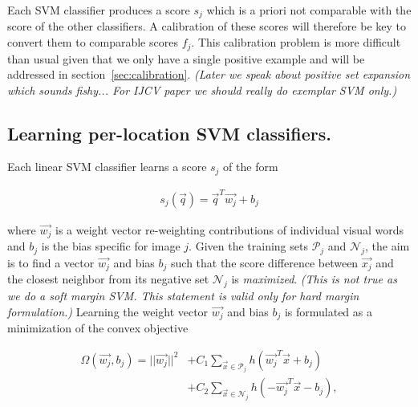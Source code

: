    \textcolor{myGrey}{
   Each SVM classifier produces a score $s_j$ which is a priori not comparable with the score of the other classifiers. A calibration of these scores will therefore be key to convert them to comparable scores $f_j$. This calibration problem is more difficult than usual given that we only have a single positive example and will be addressed in section~\ref{sec:calibration}.
   \textit{(Later we speak about positive set expansion which sounds fishy... For IJCV paper we should really do exemplar SVM only.)}
   }
   \subsection{Learning per-location SVM classifiers. }
      Each linear SVM classifier learns a score $s_j$ of the form 

      \begin{align}
        s_j(\vec{q})=\vec{q}^T \vec{w_j}+b_j
        \label{eq:linear}
      \end{align}

      \noindent
      where $\vec{w_j}$ is a weight vector re-weighting contributions of individual visual words and $b_j$ is the bias specific for image $j$. Given the training sets $\mathcal P_j$ and $\mathcal N_j$, the aim is to find a vector $\vec{w_j}$ and bias $b_j$ such that the score difference between $\vec{x_j}$ and the closest neighbor from its negative set $\mathcal N_j$ is {\em maximized}.
      \textcolor{myGrey}{
      \emph{(This is not true as we do a soft margin SVM. This statement is valid only for hard margin formulation.)}
      }
      Learning the weight vector $\vec{w_j}$ and bias $b_j$ is formulated as a minimization of the convex objective 

      \begin{align}
        \nonumber
        \Omega(\vec{w_j},b_j)=||\vec{w_j}||^{2}& +C_1\sum_{\vec{x}\in \mathcal P_j}h(\vec{w_j}^T\vec{x}+b_j)   \\
        \label{eq:obj}
                           & +C_2\sum_{\vec{x}\in \mathcal N_j}h(-\vec{w_j}^T\vec{x}-b_j), 
      \end{align}

